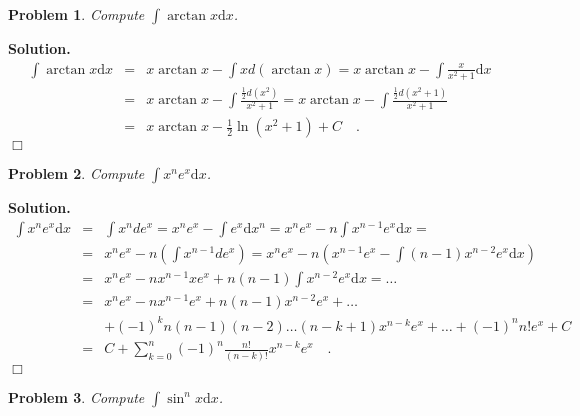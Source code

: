 \documentclass[12pt]{book}
\newcommand{\diff}{\text{d}}
\newenvironment{solution}{\textbf{Solution.} }{$\Box$}
\newtheorem{problem}{Problem}[section]
\begin{document}
\begin{problem}
Compute $\displaystyle\int \arctan x \diff x$.
\end{problem}
\begin{solution}
\[
\begin{array}{rcl}
\displaystyle\int \arctan x \diff x &=& x\displaystyle \arctan x - \int x d(\arctan x)= x\arctan x - \int \frac{x}{x^2+1}\diff x\\
&=& \displaystyle  x\arctan x - \int \frac{\frac{1}2d(x^2)}{x^2+1}=  x\arctan x - \int \frac{\frac{1}2d(x^2+1)}{x^2+1}\\
&=& x\arctan x - \frac12\ln (x^2+1) +C\quad .
\end{array}
\]
\end{solution}
\begin{problem}
Compute $\displaystyle \int x^n e^x \diff x$.
\end{problem}
\begin{solution}
\[
\begin{array}{rcl}
\displaystyle\int x^n e^x \diff x &=& \displaystyle\int x^n d e^x= x^n e^x- \int  e^x \diff x^n= x^n e^x- n\int  x^{n-1}e^x \diff x=\\
&=&\displaystyle x^ne^x- n\left(\int x^{n-1}de^x \right)= x^ne^x - n\left(x^{n-1}e^x- \int (n-1)x^{n-2}e^x \diff x\right)\\
&=&\displaystyle x^{n}e^x-nx^{n-1}xe^x+n(n-1)\int x^{n-2}e^x \diff x =\dots\\
&=&\displaystyle x^ne^{x}- nx^{n-1}e^x+n(n-1)x^{n-2}e^x+\dots \\
&&+(-1)^kn(n-1)(n-2)\dots(n-k+1)x^{n-k}e^x+\dots +(-1)^n n! e^x+C\\
&=&\displaystyle C+\sum_{k=0}^{n} (-1)^n\frac{n!}{(n-k)!} x^{n-k} e^x \quad .
\end{array}
\]
\end{solution}
\begin{problem}
Compute $\displaystyle\int \sin^n x \diff x$.

\end{problem}
\end{document}
